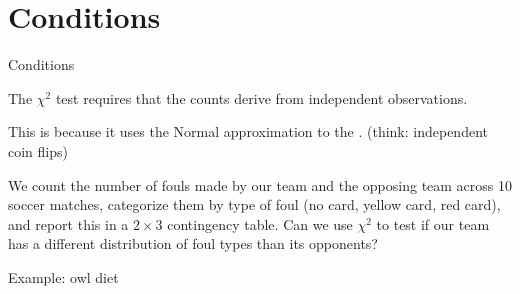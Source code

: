 % 
% 




\section{Conditions}

\begin{frame}{Conditions}

    The $\chi^2$ test requires that the counts derive from \alert{independent observations}.

    \vspace{2em}

    This is because it uses the Normal approximation to the .
    (think: independent coin flips)


    \vspace{2em}

    We count the number of fouls made by our team and the opposing team across 10 soccer matches,
    categorize them by type of foul (no card, yellow card, red card),
    and report this in a $2\times 3$ contingency table.
    Can we use $\chi^2$ to test if our team has a different distribution of foul types than its opponents?

\end{frame}


\begin{frame}{Example: owl diet}

    \begin{center}
    \end{center}


\end{frame}


